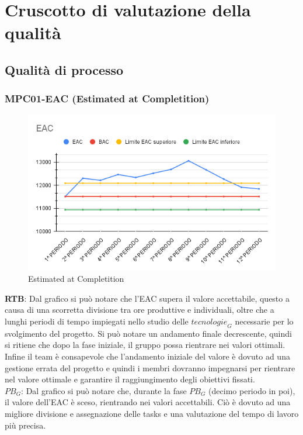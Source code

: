 \section{Cruscotto di valutazione della qualità}
\subsection{Qualità di processo}
\subsubsection{MPC01-EAC (Estimated at Completition)}
\begin{figure}[H]
  \centering
  \includegraphics[width=0.7\linewidth]{grafici/EAC.png}
  \caption{Estimated at Completition}
\end{figure}
\textbf{RTB}: Dal grafico si può notare che l'EAC supera il valore accettabile, questo a causa di una scorretta divisione tra ore produttive e individuali, oltre che a lunghi periodi di tempo impiegati nello studio delle $\textit{tecnologie}_G$ necessarie per lo svolgimento del progetto. Si può notare un andamento finale decrescente, quindi si ritiene che dopo la fase iniziale, il gruppo possa rientrare nei valori ottimali. Infine il team è consapevole che l'andamento iniziale del valore è dovuto ad una gestione errata del progetto e quindi i membri dovranno impegnarsi per rientrare nel valore ottimale e garantire il raggiungimento degli obiettivi fissati. \\
\textbf{$\textit{PB}_G$}: Dal grafico si può notare che, durante la fase $\textit{PB}_G$ (decimo periodo in poi), il valore dell'EAC è sceso, rientrando nei valori accettabili. Ciò è dovuto ad una migliore divisione e assegnazione delle tasks e una valutazione del tempo di lavoro più precisa.

